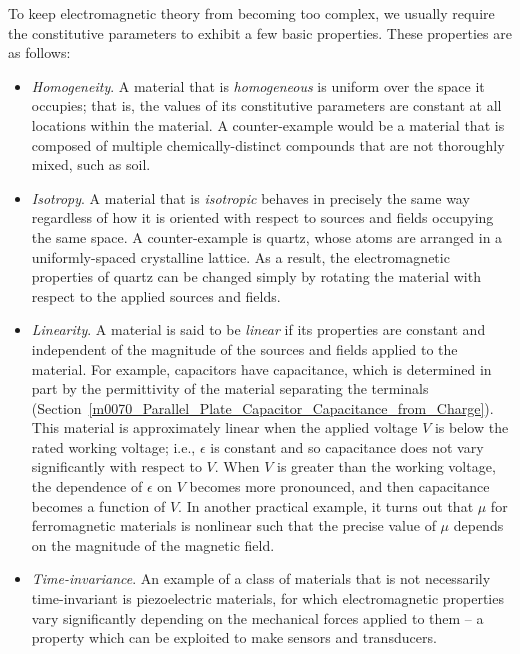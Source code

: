 To keep electromagnetic theory from becoming too complex, we usually require the constitutive parameters to exhibit a few basic properties.
These properties are as follows: 
%
\begin{itemize}
\item \emph{Homogeneity}. 
A material that is {\it homogeneous} 
is uniform over the space it occupies; that is, the values of its constitutive parameters are constant at all locations within the material. A counter-example would be a material that is composed of multiple chemically-distinct compounds that are not thoroughly mixed, such as soil.  
\item \emph{Isotropy}.  
A material that is {\it isotropic} 
behaves in precisely the same way regardless of how it is oriented with respect to sources and fields occupying the same space.  A counter-example is quartz, whose atoms are arranged in a uniformly-spaced crystalline lattice. As a result, the electromagnetic properties of quartz can be changed simply by rotating the material with respect to the applied sources and fields.  
\item \emph{Linearity}.
A material is said to be {\it linear} if its properties are constant and independent of the magnitude of the sources and fields applied to the material.  
For example, capacitors have capacitance, which is determined in part by the permittivity of the material separating the terminals (Section~\ref{m0070_Parallel_Plate_Capacitor_Capacitance_from_Charge}).
This material is approximately linear when the applied voltage $V$ is below the rated working voltage; i.e., $\epsilon$ is constant and so capacitance does not vary significantly with respect to $V$.
When $V$ is greater than the working voltage, the dependence of $\epsilon$ on $V$ becomes more pronounced, and then capacitance becomes a function of $V$.
In another practical example, it turns out that $\mu$ for ferromagnetic materials is nonlinear such that the precise value of $\mu$ depends on the magnitude of the magnetic field.
\item \emph{Time-invariance}. 
An example of a class of materials that is not necessarily time-invariant is piezoelectric materials, for which electromagnetic properties vary significantly depending on the mechanical forces applied to them -- a property which can be exploited to make sensors and transducers.
\end{itemize}

